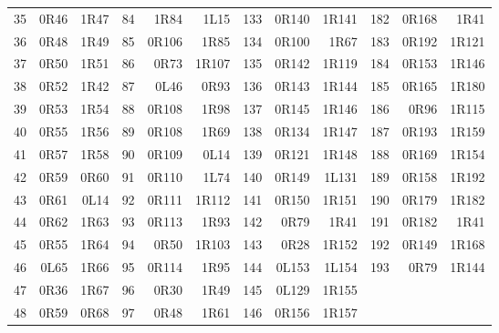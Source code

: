 \begin{center}
\begin{tabular}{@{}rrr@{\hspace{11pt}}rrr@{\hspace{11pt}}rrr@{\hspace{11pt}}rrr@{}}
35 & 0R46 & 1R47 & 84 & 1R84 & 1L15 & 133 & 0R140 & 1R141 & 182 & 0R168 & 1R41 \\
36 & 0R48 & 1R49 & 85 & 0R106 & 1R85 & 134 & 0R100 & 1R67 & 183 & 0R192 & 1R121 \\
37 & 0R50 & 1R51 & 86 & 0R73 & 1R107 & 135 & 0R142 & 1R119 & 184 & 0R153 & 1R146 \\
38 & 0R52 & 1R42 & 87 & 0L46 & 0R93 & 136 & 0R143 & 1R144 & 185 & 0R165 & 1R180 \\
39 & 0R53 & 1R54 & 88 & 0R108 & 1R98 & 137 & 0R145 & 1R146 & 186 & 0R96 & 1R115 \\
40 & 0R55 & 1R56 & 89 & 0R108 & 1R69 & 138 & 0R134 & 1R147 & 187 & 0R193 & 1R159 \\
41 & 0R57 & 1R58 & 90 & 0R109 & 0L14 & 139 & 0R121 & 1R148 & 188 & 0R169 & 1R154 \\
42 & 0R59 & 0R60 & 91 & 0R110 & 1L74 & 140 & 0R149 & 1L131 & 189 & 0R158 & 1R192 \\
43 & 0R61 & 0L14 & 92 & 0R111 & 1R112 & 141 & 0R150 & 1R151 & 190 & 0R179 & 1R182 \\
44 & 0R62 & 1R63 & 93 & 0R113 & 1R93 & 142 & 0R79 & 1R41 & 191 & 0R182 & 1R41 \\
45 & 0R55 & 1R64 & 94 & 0R50 & 1R103 & 143 & 0R28 & 1R152 & 192 & 0R149 & 1R168 \\
46 & 0L65 & 1R66 & 95 & 0R114 & 1R95 & 144 & 0L153 & 1L154 & 193 & 0R79 & 1R144 \\
47 & 0R36 & 1R67 & 96 & 0R30 & 1R49 & 145 & 0L129 & 1R155 &  &  &  \\
48 & 0R59 & 0R68 & 97 & 0R48 & 1R61 & 146 & 0R156 & 1R157 &  &  &  \\
\bottomrule
\end{tabular}
\end{center}
